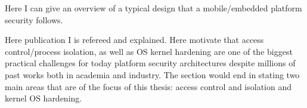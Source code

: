 Here I can give an overview of a typical design that a mobile/embedded platform security follows. 

Here publication I is refereed and explained. 
Here motivate that access control/process isolation, as well as OS kernel hardening are one of the biggest practical challenges for today platform security architectures despite millions of past works both in academia and industry. 
The section would end in stating two main areas that are of the focus of this thesis: access control and isolation and kernel OS hardening. 